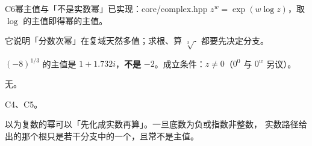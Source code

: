 \begin{know}{C6}{幂主值与「不是实数幂」}{已实现：core/complex.hpp}
 $z^{w}=\exp(w\log z)$，取 $\log$ 的主值即得幂的主值。

 它说明「分数次幂」在复域天然多值；求根、算 $\sqrt[3]{\cdot}$ 都要先决定分支。

 $(-8)^{1/3}$ 的主值是 $1+1.732i$，\textbf{不是} $-2$。成立条件：$z\ne0$（$0^{0}$ 与 $0^{w}$ 另议）。

 无。

 C4、C5。

 以为复数的幂可以「先化成实数再算」。一旦底数为负或指数非整数，
实数路径给出的那个根只是若干分支中的一个，且常不是主值。
\end{know}
